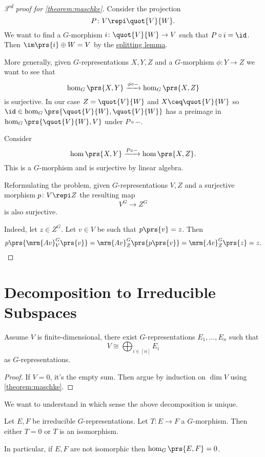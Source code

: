 \documentclass[10pt,a4paper,twoside,openany,hidelinks]{book}
\begin{document}
\begin{proof}[3\textsuperscript{rd} proof for \ref{theorem:maschke}]
Consider the projection
\[P \colon V \repi \quot{V}{W} \text{.}\]
We want to find a $G$-morphism $i \colon \quot{V}{W} \to V$ such that $P \circ i = \id$.
Then $\im\prs{i} \oplus W = V$ by the \href{https://ncatlab.org/nlab/show/split+exact+sequence}{splitting lemma}.

More generally, given $G$-representations $X,Y,Z$ and a $G$-morphism $\phi \colon Y \to Z$ we want to see that
\[\hom_G\prs{X,Y} \xrightarrow{\phi \circ -} \hom_G\prs{X,Z}\]
is surjective.
In our case $Z = \quot{V}{W}$ and $X \ceq \quot{V}{W}$ so $\id \in \hom_G\prs{\quot{V}{W}, \quot{V}{W}}$ has a preimage in $\hom_G\prs{\quot{V}{W}, V}$ under $P \circ -$.

Consider
\[\hom\prs{X, Y} \xrightarrow{P \circ -} \hom\prs{X, Z} \text{.}\]
This is a $G$-morphism and is surjective by linear algebra.

Reformulating the problem, given $G$-representations $V,Z$ and a surjective morphism $p \colon V \repi Z$ the resulting map
\[V^G \to Z^G\]
is also surjective.

\newcommand{\av}{\mrm{Av}}

Indeed, let $z \in Z^G$. Let $v \in V$ be such that $p\prs{v} = z$. Then
\[p\prs{\av_V^G\prs{v}} = \av_Z^G\prs{p\prs{v}} = \av_Z^G\prs{z} = z \text{.}\]
\end{proof}

\chapter{Decomposition to Irreducible Subspaces}

\begin{lemma}
Assume $V$ is finite-dimensional, there exist $G$-representations $E_1, \ldots, E_n$ such that
\[V \cong \bigoplus_{i \in [n]} E_i\]
as $G$-representations.
\end{lemma}

\begin{proof}
If $V = 0$, it's the empty sum. Then argue by induction on $\dim V$ using \ref{theorem:maschke}.
\end{proof}

We want to understand in which sense the above decomposition is unique.

\begin{lemma}[Schur] \label{lemma:schur}
Let $E,F$ be irreducible $G$-representations. Let $T \colon E \to F$ a $G$-morphism. Then either $T = 0$ or $T$ is an isomorphism.

In particular, if $E,F$ are not isomorphic then
$\hom_G\prs{E,F} = 0$.
\end{lemma}
\end{document}
